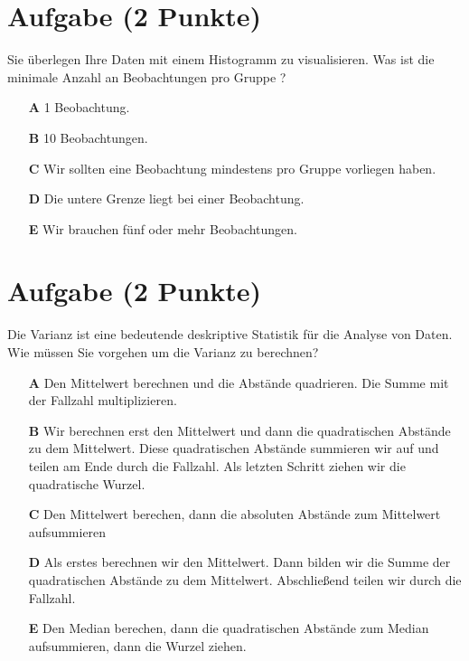 \documentclass[a4paper, 9pt]{scrartcl}\usepackage[]{graphicx}\usepackage[]{xcolor}
\begin{document}
\section{Aufgabe \hfill (2 Punkte)}



Sie überlegen Ihre Daten mit einem Histogramm zu visualisieren. Was ist die minimale Anzahl an Beobachtungen pro Gruppe ?



\begin{enumerate}
\item [\textbf{A} \msquare] 1 Beobachtung.
\item [\textbf{B} \msquare] 10 Beobachtungen.
\item [\textbf{C} \msquare] Wir sollten eine Beobachtung mindestens pro Gruppe vorliegen haben.
\item [\textbf{D} \msquare] Die untere Grenze liegt bei einer Beobachtung.
\item [\textbf{E} \msquare] Wir brauchen fünf oder mehr Beobachtungen.
\end{enumerate}

\section{Aufgabe \hfill (2 Punkte)}



Die Varianz ist eine bedeutende deskriptive Statistik für die Analyse von Daten. Wie müssen Sie vorgehen um die Varianz zu berechnen?



\begin{enumerate}
\item [\textbf{A} \msquare] Den Mittelwert berechnen und die Abstände quadrieren. Die Summe mit der Fallzahl multiplizieren.
\item [\textbf{B} \msquare] Wir berechnen erst den Mittelwert und dann die quadratischen Abstände zu dem Mittelwert. Diese quadratischen Abstände summieren wir auf und teilen am Ende durch die Fallzahl. Als letzten Schritt ziehen wir die quadratische Wurzel.
\item [\textbf{C} \msquare] Den Mittelwert berechen, dann die absoluten Abstände zum Mittelwert aufsummieren
\item [\textbf{D} \msquare] Als erstes berechnen wir den Mittelwert. Dann bilden wir die Summe der quadratischen Abstände zu dem Mittelwert. Abschließend teilen wir durch die Fallzahl.
\item [\textbf{E} \msquare] Den Median berechen, dann die quadratischen Abstände zum Median aufsummieren, dann die Wurzel ziehen.
\end{enumerate} 
\end{document}

